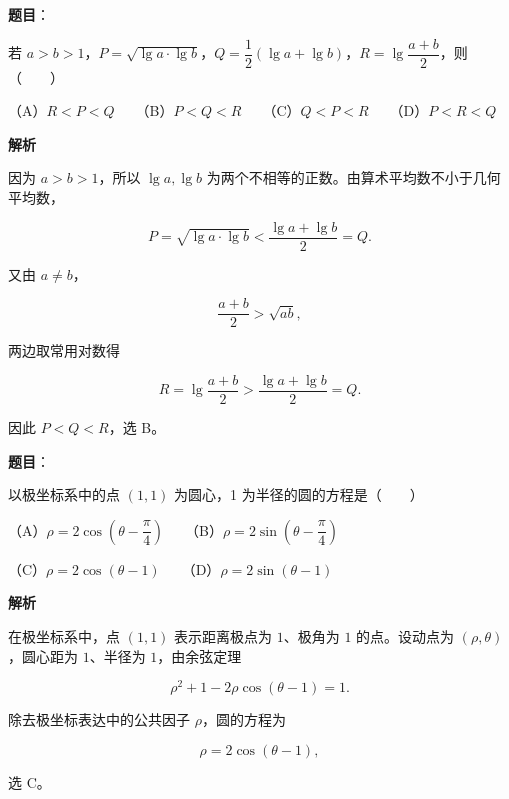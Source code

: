 \begin{answer}

\textbf{题目}：

若 $a>b>1$，$P=\sqrt{\lg a\cdot\lg b}$，$Q=\dfrac12(\lg a+\lg b)$，$R=\lg\dfrac{a+b}{2}$，则\mbox{（　　）}

（A）$R<P<Q$　　（B）$P<Q<R$　　（C）$Q<P<R$　　（D）$P<R<Q$

\textbf{解析}

因为 $a>b>1$，所以 $\lg a,\lg b$ 为两个不相等的正数。由算术平均数不小于几何平均数，

\nopagebreak[4]
\[
P=\sqrt{\lg a\cdot\lg b}
<\frac{\lg a+\lg b}{2}=Q.
\]

又由 $a\ne b$，

\nopagebreak[4]
\[
\frac{a+b}{2}>\sqrt{ab},
\]

两边取常用对数得

\nopagebreak[4]
\[
R=\lg\frac{a+b}{2}
>\frac{\lg a+\lg b}{2}=Q.
\]

因此 $P<Q<R$，选 B。


\end{answer}
\begin{answer}

\textbf{题目}：

以极坐标系中的点 $(1,1)$ 为圆心，1 为半径的圆的方程是\mbox{（　　）}

（A）$\rho=2\cos\left(\theta-\dfrac\pi4\right)$　　（B）$\rho=2\sin\left(\theta-\dfrac\pi4\right)$

（C）$\rho=2\cos(\theta-1)$　　（D）$\rho=2\sin(\theta-1)$

\textbf{解析}

在极坐标系中，点 $(1,1)$ 表示距离极点为 $1$、极角为 $1$ 的点。设动点为 $(\rho,\theta)$，圆心距为 $1$、半径为 $1$，由余弦定理

\nopagebreak[4]
\[
\rho^2+1-2\rho\cos(\theta-1)=1.
\]

除去极坐标表达中的公共因子 $\rho$，圆的方程为

\nopagebreak[4]
\[
\rho=2\cos(\theta-1),
\]

选 C。


\end{answer}
